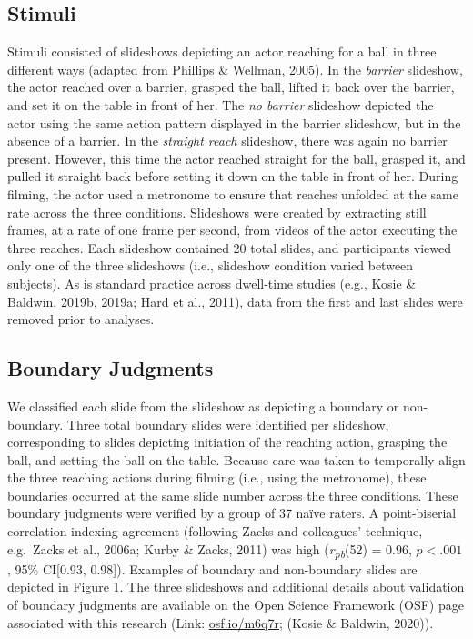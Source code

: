 \documentclass[
  english,
  man,floatsintext]{apa6}
\begin{document}
\hypertarget{stimuli}{%
\subsection{Stimuli}\label{stimuli}}

Stimuli consisted of slideshows depicting an actor reaching for a ball in three different ways (adapted from Phillips \& Wellman, 2005). In the \emph{barrier} slideshow, the actor reached over a barrier, grasped the ball, lifted it back over the barrier, and set it on the table in front of her. The \emph{no barrier} slideshow depicted the actor using the same action pattern displayed in the barrier slideshow, but in the absence of a barrier. In the \emph{straight reach} slideshow, there was again no barrier present. However, this time the actor reached straight for the ball, grasped it, and pulled it straight back before setting it down on the table in front of her. During filming, the actor used a metronome to ensure that reaches unfolded at the same rate across the three conditions. Slideshows were created by extracting still frames, at a rate of one frame per second, from videos of the actor executing the three reaches. Each slideshow contained 20 total slides, and participants viewed only one of the three slideshows (i.e., slideshow condition varied between subjects). As is standard practice across dwell-time studies (e.g., Kosie \& Baldwin, 2019b, 2019a; Hard et al., 2011), data from the first and last slides were removed prior to analyses.

\hypertarget{boundary-judgments}{%
\subsection{Boundary Judgments}\label{boundary-judgments}}

We classified each slide from the slideshow as depicting a boundary or non-boundary. Three total boundary slides were identified per slideshow, corresponding to slides depicting initiation of the reaching action, grasping the ball, and setting the ball on the table. Because care was taken to temporally align the three reaching actions during filming (i.e., using the metronome), these boundaries occurred at the same slide number across the three conditions. These boundary judgments were verified by a group of 37 naïve raters. A point-biserial correlation indexing agreement (following Zacks and colleagues' technique, e.g.~Zacks et al., 2006a; Kurby \& Zacks, 2011) was high (\emph{r\textsubscript{pb}}(52) = 0.96, \(p < .001\), 95\% CI{[}0.93, 0.98{]}). Examples of boundary and non-boundary slides are depicted in Figure 1. The three slideshows and additional details about validation of boundary judgments are available on the Open Science Framework (OSF) page associated with this research (Link: \href{https://osf.io/m6q7r}{osf.io/m6q7r}; (Kosie \& Baldwin, 2020)).
\end{document}
